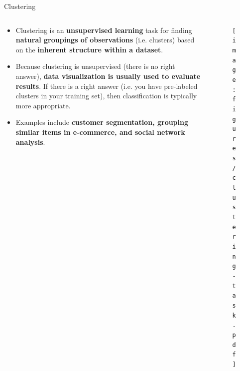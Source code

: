 \documentclass[main.tex]{subfiles}
\begin{document}
    \begin{frame}{Clustering}
        \begin{columns}
            \begin{column}{.6\textwidth}
                \begin{itemize}
                    \item Clustering is an \textbf{unsupervised learning} task for finding \textbf{natural groupings of observations} (i.e. clusters) based on the \textbf{inherent structure within a dataset}. 
                    \item Because clustering is unsupervised (there is no right answer), \textbf{data visualization is usually used to evaluate results}. If there is a right answer (i.e. you have pre-labeled clusters in your training set), then classification is typically more appropriate.
                    \item Examples include \textbf{customer segmentation, grouping similar items in e-commerce, and social network analysis}.
                \end{itemize}
            \end{column}
            \begin{column}{.4\textwidth}
                \begin{figure}
                    \label{fig:clustering-task}
                    \texttt{[image: figures/clustering-task.pdf]}
                \end{figure}
            \end{column}
        \end{columns}
    \end{frame}
\end{document}
